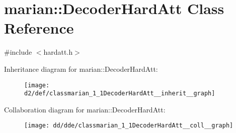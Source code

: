 \hypertarget{classmarian_1_1DecoderHardAtt}{}\section{marian\+:\+:Decoder\+Hard\+Att Class Reference}
\label{classmarian_1_1DecoderHardAtt}


{\ttfamily \#include $<$hardatt.\+h$>$}



Inheritance diagram for marian\+:\+:Decoder\+Hard\+Att\+:
\nopagebreak
\begin{figure}[H]
\begin{center}
\leavevmode
\texttt{[image: d2/def/classmarian\_1\_1DecoderHardAtt\_\_inherit\_\_graph]}
\end{center}
\end{figure}


Collaboration diagram for marian\+:\+:Decoder\+Hard\+Att\+:
\nopagebreak
\begin{figure}[H]
\begin{center}
\leavevmode
\texttt{[image: dd/dde/classmarian\_1\_1DecoderHardAtt\_\_coll\_\_graph]}
\end{center}
\end{figure}
